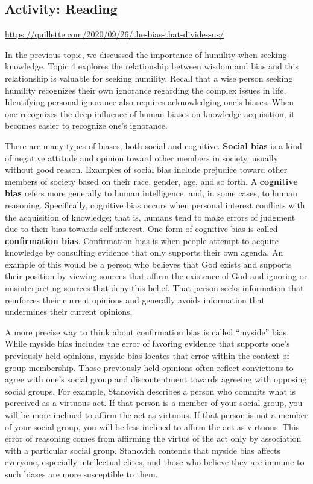 \documentclass[
]{book}
\begin{document}
\hypertarget{activity-reading-2}{%
\subsection*{Activity: Reading}\label{activity-reading-2}}

\begin{reflect}
\url{https://quillette.com/2020/09/26/the-bias-that-divides-us/}
\end{reflect}

In the previous topic, we discussed the importance of humility when seeking knowledge. Topic 4 explores the relationship between wisdom and bias and this relationship is valuable for seeking humility. Recall that a wise person seeking humility recognizes their own ignorance regarding the complex issues in life. Identifying personal ignorance also requires acknowledging one's biases. When one recognizes the deep influence of human biases on knowledge acquisition, it becomes easier to recognize one's ignorance.

There are many types of biases, both social and cognitive. \textbf{Social bias} is a kind of negative attitude and opinion toward other members in society, usually without good reason. Examples of social bias include prejudice toward other members of society based on their race, gender, age, and so forth. A \textbf{cognitive bias} refers more generally to human intelligence, and, in some cases, to human reasoning. Specifically, cognitive bias occurs when personal interest conflicts with the acquisition of knowledge; that is, humans tend to make errors of judgment due to their bias towards self-interest. One form of cognitive bias is called \textbf{confirmation bias}. Confirmation bias is when people attempt to acquire knowledge by consulting evidence that only supports their own agenda. An example of this would be a person who believes that God exists and supports their position by viewing sources that affirm the existence of God and ignoring or misinterpreting sources that deny this belief. That person seeks information that reinforces their current opinions and generally avoids information that undermines their current opinions.

A more precise way to think about confirmation bias is called ``myside'' bias. While myside bias includes the error of favoring evidence that supports one's previously held opinions, myside bias locates that error within the context of group membership. Those previously held opinions often reflect convictions to agree with one's social group and discontentment towards agreeing with opposing social groups. For example, Stanovich describes a person who commits what is perceived as a virtuous act. If that person is a member of your social group, you will be more inclined to affirm the act as virtuous. If that person is not a member of your social group, you will be less inclined to affirm the act as virtuous. This error of reasoning comes from affirming the virtue of the act only by association with a particular social group. Stanovich contends that myside bias affects everyone, especially intellectual elites, and those who believe they are immune to such biases are more susceptible to them.
\end{document}

